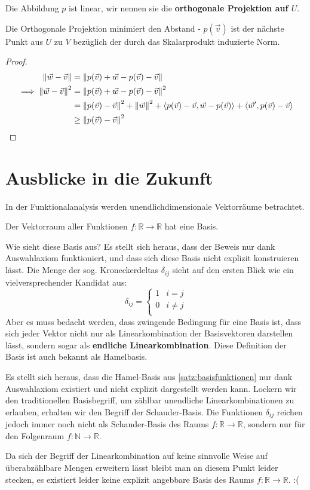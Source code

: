 \documentclass{report}
\newcommand*{\newpar}{\par\vspace{\baselineskip}\noindent}
\newcommand{\tbf}[1]{\textbf{#1}}
\newcommand{\bN}{\mathbb{N}}
\newcommand{\bR}{\mathbb{R}}
\newcommand{\vv}{\vec{v}}
\newcommand{\vw}{\vec{w}}
\newcommand{\scalar}[2]{\left\langle #1, #2 \right\rangle}
\begin{document}
\begin{anmerkung}
 Die Abbildung $p$ ist linear, wir nennen sie die \tbf{orthogonale Projektion auf $U$}.
\end{anmerkung}
\begin{beobachtung}
 Die Orthogonale Projektion minimiert den Abstand - $p(\vv)$ ist der nächste Punkt aus $U$ zu $V$ bezüglich der durch das Skalarprodukt induzierte Norm.
\end{beobachtung}
\begin{proof}
 \begin{align*}
  \norm{\vw - \vv} &= \norm{p(\vv) + \vw - p(\vv) - \vv}\\
  \implies \norm{\vw - \vv}^2 &= \norm{p(\vv) + \vw - p(\vv) - \vv}^2\\
  &= \norm{p(\vv) - \vv}^2 + \norm{\vw}^2 + \scalar{p(\vv) - \vv}{\vw - p(\vv)} + \scalar{\vw'}{p(\vv) - \vv}\\
  &\geq \norm{p(\vv) - \vv}^2
 \end{align*}
\end{proof}

%
%
%
%
%
%
%
%
%
%
%
%
%
%
%
%
%
%
%
%
\appendix
\chapter{Ausblicke in die Zukunft}
In der Funktionalanalysis werden unendlichdimensionale Vektorräume betrachtet. 
\begin{theorem}
\label{satz:basisfunktionen}
Der Vektorraum aller Funktionen $f: \bR \to \bR$ hat eine Basis.
\end{theorem}
\newpar
Wie sieht diese Basis aus? Es stellt sich heraus, dass der Beweis nur dank Auswahlaxiom funktioniert, und dass sich diese Basis nicht explizit konstruieren lässt. Die Menge der sog. Kroneckerdeltas $\delta_{ij}$ sieht auf den ersten Blick wie ein vielversprechender Kandidat aus:
\begin{equation*}
 \delta_{ij} = \begin{cases}
            1 & i = j\\
            0 & i \neq j\\
           \end{cases}
\end{equation*}
Aber es muss bedacht werden, dass zwingende Bedingung für eine Basis ist, dass sich jeder Vektor nicht nur als Linearkombination der Basisvektoren darstellen lässt, sondern sogar als \tbf{endliche Linearkombination}. Diese Definition der Basis ist auch bekannt als Hamelbasis.
\newpar
Es stellt sich heraus, dass die Hamel-Basis aus \ref{satz:basisfunktionen} nur dank Auswahlaxiom existiert und nicht explizit dargestellt werden kann. Lockern wir den traditionellen Basisbegriff, um zählbar unendliche Linearkombinationen zu erlauben, erhalten wir den Begriff der Schauder-Basis. Die Funktionen $\delta_{ij}$ reichen jedoch immer noch nicht als Schauder-Basis des Raums $f: \bR \to \bR$, sondern nur für den Folgenraum $f: \bN \to \bR$. 
\newpar
Da sich der Begriff der Linearkombination auf keine sinnvolle Weise auf überabzählbare Mengen erweitern lässt bleibt man an diesem Punkt leider stecken, es existiert leider keine explizit angebbare Basis des Raums $f: \bR \to \bR$. :(
\end{document}
